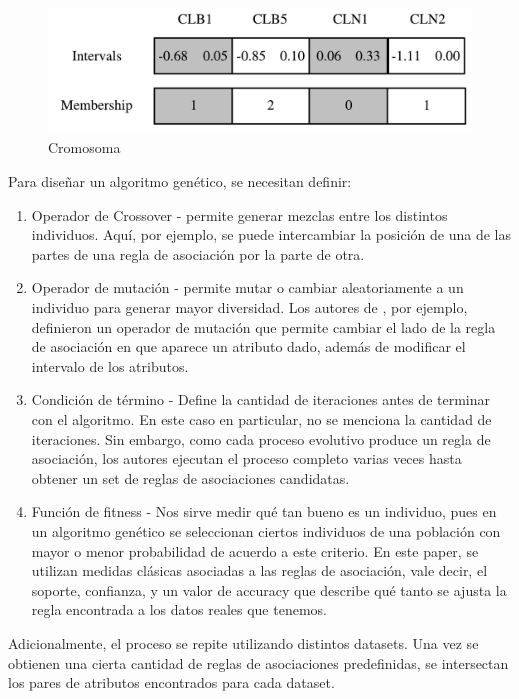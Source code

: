 \documentclass[12pt,spanish]{article}
\begin{document}
\begin{figure}
\centering
\includegraphics[scale=0.4]{association.png}
\caption{Cromosoma}
\end{figure}

Para dise\~{n}ar un algoritmo gen\'etico, se necesitan definir:

\begin{enumerate}
\item Operador de Crossover - permite generar mezclas entre los distintos individuos. Aqu\'i, por ejemplo, se puede intercambiar la posici\'on de una de las partes de una regla de asociaci\'on por la parte de otra.
\item Operador de mutaci\'on - permite mutar o cambiar aleatoriamente a un individuo para generar mayor diversidad. Los autores de \cite{gene}, por ejemplo, definieron un operador de mutaci\'on que permite cambiar el lado de la regla de asociaci\'on en que aparece un atributo dado, adem\'as de modificar el intervalo de los atributos.
\item Condici\'on de t\'ermino - Define la cantidad de iteraciones antes de terminar con el algoritmo. En este caso en particular, no se menciona la cantidad de iteraciones. Sin embargo, como cada proceso evolutivo produce un regla de asociaci\'on, los autores ejecutan el proceso completo varias veces hasta obtener un set de reglas de asociaciones candidatas.
\item Funci\'on de fitness - Nos sirve medir qu\'e tan bueno es un individuo, pues en un algoritmo gen\'etico se seleccionan ciertos individuos de una poblaci\'on con mayor o menor probabilidad de acuerdo a este criterio. En este paper, se utilizan medidas cl\'asicas asociadas a las reglas de asociaci\'on, vale decir, el soporte, confianza, y un valor de accuracy que describe qu\'e tanto se ajusta la regla encontrada a los datos reales que tenemos.
\end{enumerate}


Adicionalmente, el proceso se repite utilizando distintos datasets. Una vez se obtienen una cierta cantidad de reglas de asociaciones predefinidas, se intersectan los pares de atributos encontrados para cada dataset.
\end{document}

